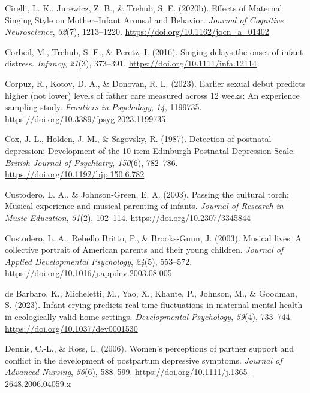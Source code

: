 \documentclass[
]{article}
\newlength{\cslhangindent}
\newenvironment{CSLReferences}[2] %
 {\begin{list}{}{%
  \setlength{\itemindent}{0pt}
  \setlength{\leftmargin}{0pt}
  \setlength{\parsep}{0pt}
  \ifodd #1
   \setlength{\leftmargin}{\cslhangindent}
   \setlength{\itemindent}{-1\cslhangindent}
  \fi
  \setlength{\itemsep}{#2\baselineskip}}}
 {\end{list}}
\begin{document}
\begin{CSLReferences}{1}{0}
Cirelli, L. K., Jurewicz, Z. B., \& Trehub, S. E. (2020b). Effects of
{Maternal Singing Style} on {Mother}--{Infant Arousal} and {Behavior}.
\emph{Journal of Cognitive Neuroscience}, \emph{32}(7), 1213--1220.
\url{https://doi.org/10.1162/jocn_a_01402}

Corbeil, M., Trehub, S. E., \& Peretz, I. (2016). Singing delays the
onset of infant distress. \emph{Infancy}, \emph{21}(3), 373--391.
\url{https://doi.org/10.1111/infa.12114}

Corpuz, R., Kotov, D. A., \& Donovan, R. L. (2023). Earlier sexual debut
predicts higher (not lower) levels of father care measured across 12
weeks: An experience sampling study. \emph{Frontiers in Psychology},
\emph{14}, 1199735. \url{https://doi.org/10.3389/fpsyg.2023.1199735}

Cox, J. L., Holden, J. M., \& Sagovsky, R. (1987). Detection of
postnatal depression: {Development} of the 10-item {Edinburgh Postnatal
Depression Scale}. \emph{British Journal of Psychiatry}, \emph{150}(6),
782--786. \url{https://doi.org/10.1192/bjp.150.6.782}

Custodero, L. A., \& Johnson-Green, E. A. (2003). Passing the cultural
torch: {Musical} experience and musical parenting of infants.
\emph{Journal of Research in Music Education}, \emph{51}(2), 102--114.
\url{https://doi.org/10.2307/3345844}

Custodero, L. A., Rebello Britto, P., \& Brooks-Gunn, J. (2003). Musical
lives: {A} collective portrait of {American} parents and their young
children. \emph{Journal of Applied Developmental Psychology},
\emph{24}(5), 553--572.
\url{https://doi.org/10.1016/j.appdev.2003.08.005}

de Barbaro, K., Micheletti, M., Yao, X., Khante, P., Johnson, M., \&
Goodman, S. (2023). Infant crying predicts real-time fluctuations in
maternal mental health in ecologically valid home settings.
\emph{Developmental Psychology}, \emph{59}(4), 733--744.
\url{https://doi.org/10.1037/dev0001530}

Dennis, C.-L., \& Ross, L. (2006). Women's perceptions of partner
support and conflict in the development of postpartum depressive
symptoms. \emph{Journal of Advanced Nursing}, \emph{56}(6), 588--599.
\url{https://doi.org/10.1111/j.1365-2648.2006.04059.x}


\end{CSLReferences}
\end{document}
